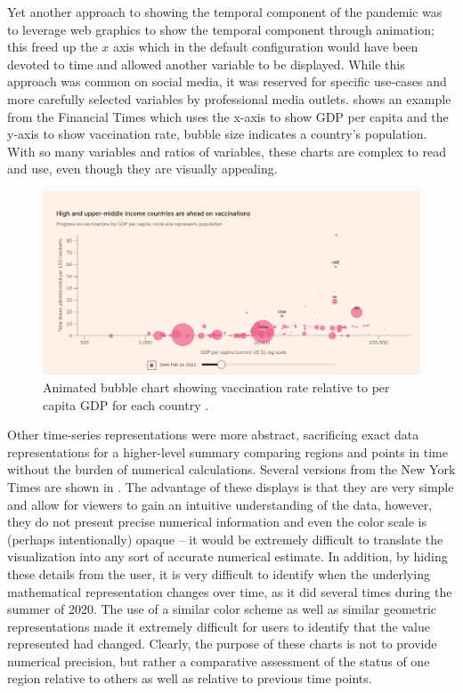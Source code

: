 \documentclass[article]{jdssv}\usepackage[]{graphicx}\usepackage[]{xcolor}
\begin{document}
Yet another approach to showing the temporal component of the pandemic was to leverage web graphics to show the temporal component through animation; this freed up the $x$ axis which in the default configuration would have been devoted to time and allowed another variable to be displayed. While this approach was common on social media, it was reserved for specific use-cases and more carefully selected variables by professional media outlets.  shows an example from the Financial Times which uses the x-axis to show GDP per capita and the y-axis to show vaccination rate, bubble size indicates a country's population. With so many variables and ratios of variables, these charts are complex to read and use, even though they are visually appealing.

\begin{figure}
\centering
\includegraphics{ft_vaccine_bubble}
\caption{Animated bubble chart showing vaccination rate relative to per capita GDP for each country \citep{visualCovid19VaccineTracker}.}\label{fig:bubble-ft}
\end{figure}

Other time-series representations were more abstract, sacrificing exact data representations for a higher-level summary comparing regions and points in time without the burden of numerical calculations. Several versions from the New York Times are shown in . The advantage of these displays is that they are very simple and allow for viewers to gain an intuitive understanding of the data, however, they do not present precise numerical information and even the color scale is (perhaps intentionally) opaque -- it would be extremely difficult to translate the visualization into any sort of accurate numerical estimate. In addition, by hiding these details from the user, it is very difficult to identify when the underlying mathematical representation changes over time, as it did several times during the summer of 2020. The use of a similar color scheme as well as similar geometric representations made it extremely difficult for users to identify that the value represented had changed. Clearly, the purpose of these charts is not to provide numerical precision, but rather a comparative assessment of the status of one region relative to others as well as relative to previous time points. 
\end{document}
